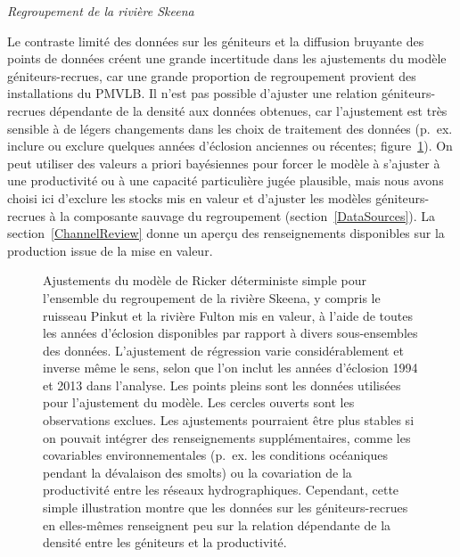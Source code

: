 \documentclass[french,11pt]{book}
\begin{document}
\emph{Regroupement de la rivière Skeena}

Le contraste limité des données sur les géniteurs et la diffusion bruyante des points de données créent une grande incertitude dans les ajustements du modèle géniteurs-recrues, car une grande proportion de regroupement provient des installations du PMVLB. Il n'est pas possible d'ajuster une relation géniteurs-recrues dépendante de la densité aux données obtenues, car l'ajustement est très sensible à de légers changements dans les choix de traitement des données (p.~ex. inclure ou exclure quelques années d'éclosion anciennes ou récentes; figure~\ref{fig:AltFitPlotSkeena}). On peut utiliser des valeurs a priori bayésiennes pour forcer le modèle à s'ajuster à une productivité ou à une capacité particulière jugée plausible, mais nous avons choisi ici d'exclure les stocks mis en valeur et d'ajuster les modèles géniteurs-recrues à la composante sauvage du regroupement (section~\ref{DataSources}). La section~\ref{ChannelReview} donne un aperçu des renseignements disponibles sur la production issue de la mise en valeur.

\clearpage


\begin{figure}[htb]

{\centering {} 

}

\caption{Ajustements du modèle de Ricker déterministe simple pour l'ensemble du regroupement de la rivière Skeena, y compris le ruisseau Pinkut et la rivière Fulton mis en valeur, à l'aide de toutes les années d'éclosion disponibles par rapport à divers sous-ensembles des données. L'ajustement de régression varie considérablement et inverse même le sens, selon que l'on inclut les années d'éclosion 1994 et 2013 dans l'analyse. Les points pleins sont les données utilisées pour l'ajustement du modèle. Les cercles ouverts sont les observations exclues. Les ajustements pourraient être plus stables si on pouvait intégrer des renseignements supplémentaires, comme les covariables environnementales (p.~ex. les conditions océaniques pendant la dévalaison des smolts) ou la covariation de la productivité entre les réseaux hydrographiques. Cependant, cette simple illustration montre que les données sur les géniteurs-recrues en elles-mêmes renseignent peu sur la relation dépendante de la densité entre les géniteurs et la productivité.}\label{fig:AltFitPlotSkeena}
\end{figure}
\clearpage
\end{document}
